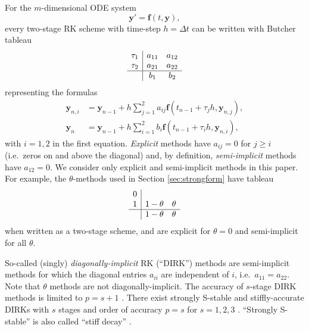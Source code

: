 \documentclass[final,leqno,onefignum,onetabnum]{siamltex1213bueler}
\newcommand\bbf{\mathbf{f}}
\newcommand\by{\mathbf{y}}
\begin{document}
For the $m$-dimensional ODE system
\begin{equation}
  \by' = \bbf(t,\by),  \label{eq:abstractODE}
\end{equation}
every two-stage RK scheme with time-step $h=\Delta t$ can be written with Butcher tableau \cite{AscherPetzold1998}
\begin{equation}
\begin{array}{c|cc}
\tau_1 & a_{11} & a_{12}  \\
\tau_2 & a_{21} & a_{22}  \\ \hline
       & b_1    & b_2     \\
\end{array}  \label{eq:tableau}
\end{equation}
representing the formulas
\begin{align*}
  \by_{n,i} &= \by_{n-1} + h \sum_{j=1}^2 a_{ij} \bbf(t_{n-1} + \tau_j h, \by_{n,j}), \\
      \by_n &= \by_{n-1} + h \sum_{i=1}^2 b_i \bbf(t_{n-1} + \tau_i h, \by_{n,i}),
\end{align*}
with $i=1,2$ in the first equation.  \emph{Explicit} methods have $a_{ij}=0$ for $j\ge i$ (i.e.~zeros on and above the diagonal) and, by definition, \emph{semi-implicit} methods have $a_{12}=0$.  We consider only explicit and semi-implicit methods in this paper.  For example, the $\theta$-methods used in Section \ref{sec:strongform} have tableau
\begin{equation*}
\begin{array}{c|cc}
0 &          &   \\
1 & 1-\theta & \theta  \\ \hline
  & 1-\theta & \theta  \\
\end{array}
\end{equation*}
when written as a two-stage scheme, and are explicit for $\theta=0$ and semi-implicit for all $\theta$.

So-called (singly) \emph{diagonally-implicit} RK (``DIRK'') methods are semi-implicit methods for which the diagonal entries $a_{ii}$ are independent of $i$, i.e.~$a_{11}=a_{22}$.  Note that $\theta$ methods are not diagonally-implicit.  The accuracy of $s$-stage DIRK methods is limited to $p=s+1$ \cite{AscherPetzold1998}.  There exist strongly S-stable and stiffly-accurate \cite{AscherPetzold1998} DIRKs with $s$ stages and order of accuracy $p=s$ for $s=1,2,3$ \cite{Alexander1977}.  ``Strongly S-stable'' is also called ``stiff decay'' \cite{AscherPetzold1998}.
\end{document}
